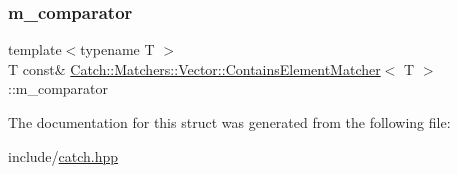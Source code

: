 \subsubsection{\texorpdfstring{m\_comparator}{m\_comparator}}
{\footnotesize\ttfamily template$<$typename T $>$ \\
T const\& \mbox{\hyperlink{struct_catch_1_1_matchers_1_1_vector_1_1_contains_element_matcher}{Catch\+::\+Matchers\+::\+Vector\+::\+Contains\+Element\+Matcher}}$<$ T $>$\+::m\+\_\+comparator}



The documentation for this struct was generated from the following file\+:\begin{DoxyCompactItemize}
\item 
include/\mbox{\hyperlink{catch_8hpp}{catch.\+hpp}}\end{DoxyCompactItemize}
